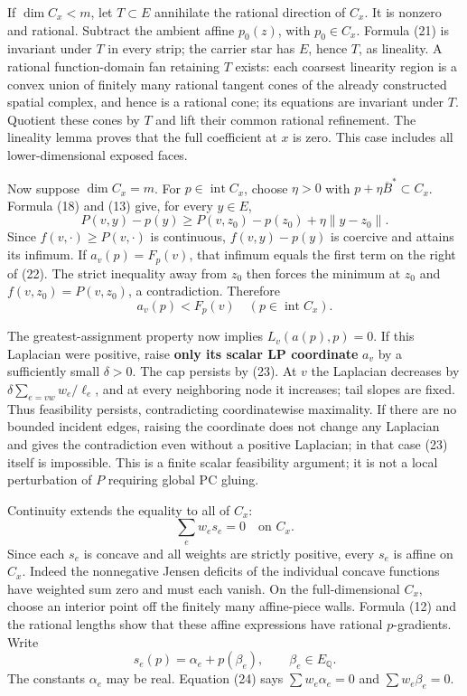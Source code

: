 \documentclass[
  11pt,
]{article}
\begin{document}
If \(\dim C_x<m\), let \(T\subset E\) annihilate the rational direction
of \(C_x\). It is nonzero and rational. Subtract the ambient affine
\(p_0(z)\), with \(p_0\in C_x\). Formula (21) is invariant under \(T\)
in every strip; the carrier star has \(E\), hence \(T\), as lineality. A
rational function-domain fan retaining \(T\) exists: each coarsest
linearity region is a convex union of finitely many rational tangent
cones of the already constructed spatial complex, and hence is a
rational cone; its equations are invariant under \(T\). Quotient these
cones by \(T\) and lift their common rational refinement. The lineality
lemma proves that the full coefficient at \(x\) is zero. This case
includes all lower-dimensional exposed faces.

Now suppose \(\dim C_x=m\). For \(p\in\operatorname{int}C_x\), choose
\(\eta>0\) with \(p+\eta\overline B^*\subset C_x\). Formula (18) and
(13) give, for every \(y\in E\), \[
 P(v,y)-p(y)\geq P(v,z_0)-p(z_0)+\eta\|y-z_0\|.                           \tag{22}
\] Since \(f(v,\cdot)\geq P(v,\cdot)\) is continuous, \(f(v,y)-p(y)\) is
coercive and attains its infimum. If \(a_v(p)=F_p(v)\), that infimum
equals the first term on the right of (22). The strict inequality away
from \(z_0\) then forces the minimum at \(z_0\) and
\(f(v,z_0)=P(v,z_0)\), a contradiction. Therefore \[
                         a_v(p)<F_p(v)\quad(p\in\operatorname{int}C_x).    \tag{23}
\]

The greatest-assignment property now implies \(L_v(a(p),p)=0\). If this
Laplacian were positive, raise \textbf{only its scalar LP coordinate}
\(a_v\) by a sufficiently small \(\delta>0\). The cap persists by (23).
At \(v\) the Laplacian decreases by \(\delta\sum_{e=vw}w_e/\ell_e\), and
at every neighboring node it increases; tail slopes are fixed. Thus
feasibility persists, contradicting coordinatewise maximality. If there
are no bounded incident edges, raising the coordinate does not change
any Laplacian and gives the contradiction even without a positive
Laplacian; in that case (23) itself is impossible. This is a finite
scalar feasibility argument; it is not a local perturbation of \(P\)
requiring global PC gluing.

Continuity extends the equality to all of \(C_x\): \[
                              \sum_e w_es_e=0\quad\text{on }C_x.           \tag{24}
\] Since each \(s_e\) is concave and all weights are strictly positive,
every \(s_e\) is affine on \(C_x\). Indeed the nonnegative Jensen
deficits of the individual concave functions have weighted sum zero and
must each vanish. On the full-dimensional \(C_x\), choose an interior
point off the finitely many affine-piece walls. Formula (12) and the
rational lengths show that these affine expressions have rational
\(p\)-gradients. Write \[
                    s_e(p)=\alpha_e+p(\beta_e),\qquad\beta_e\in E_{\mathbb{Q}}.
                                                                         \tag{25}
\] The constants \(\alpha_e\) may be real. Equation (24) says
\(\sum w_e\alpha_e=0\) and \(\sum w_e\beta_e=0\).
\end{document}
